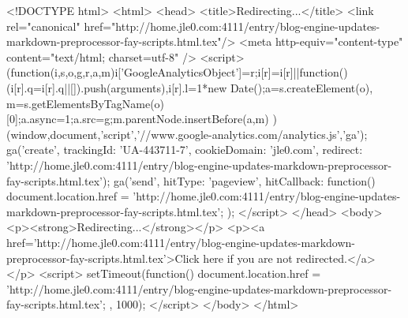 <!DOCTYPE html>
<html>
<head>
<title>Redirecting...</title>
<link rel="canonical" href="http://home.jle0.com:4111/entry/blog-engine-updates-markdown-preprocessor-fay-scripts.html.tex"/>
<meta http-equiv="content-type" content="text/html; charset=utf-8" />
<script>
(function(i,s,o,g,r,a,m){i['GoogleAnalyticsObject']=r;i[r]=i[r]||function(){
(i[r].q=i[r].q||[]).push(arguments)},i[r].l=1*new Date();a=s.createElement(o),
m=s.getElementsByTagName(o)[0];a.async=1;a.src=g;m.parentNode.insertBefore(a,m)
})(window,document,'script','//www.google-analytics.com/analytics.js','ga');
ga('create', { trackingId: 'UA-443711-7', cookieDomain: 'jle0.com', redirect: 'http://home.jle0.com:4111/entry/blog-engine-updates-markdown-preprocessor-fay-scripts.html.tex'});
ga('send', { hitType: 'pageview', hitCallback: function() { document.location.href = 'http://home.jle0.com:4111/entry/blog-engine-updates-markdown-preprocessor-fay-scripts.html.tex'; } });
</script>
</head>
<body>
  <p><strong>Redirecting...</strong></p>
  <p><a href='http://home.jle0.com:4111/entry/blog-engine-updates-markdown-preprocessor-fay-scripts.html.tex'>Click here if you are not redirected.</a></p>
  <script>
    setTimeout(function() { document.location.href = 'http://home.jle0.com:4111/entry/blog-engine-updates-markdown-preprocessor-fay-scripts.html.tex'; }, 1000);
  </script>
</body>
</html>
